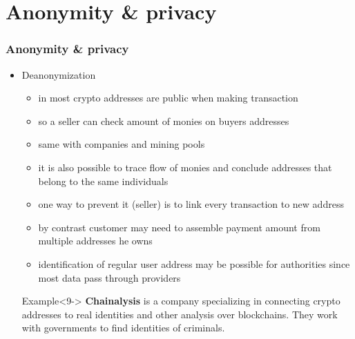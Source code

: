 \documentclass{beamer}
\begin{document}
\section{Anonymity \& privacy}
\begin{frame}
    \frametitle{Anonymity \& privacy}
    \begin{itemize}
        \item<1-> Deanonymization
        \begin{itemize}
            \item<2-> in most crypto addresses are public when making transaction
            \item<3-> so a seller can check amount of monies on buyers addresses
            \item<4-> same with companies and mining pools
            \item<5-> it is also possible to trace flow of monies and conclude addresses that belong to the same individuals
            \item<6-> one way to prevent it (seller) is to link every transaction to new address
            \item<7-> by contrast customer may need to assemble payment amount from multiple addresses he owns
            \item<8-> identification of regular user address may be possible for authorities since most data pass through providers
        \end{itemize}
        \begin{exampleblock}{Example}<9->
            \textbf{Chainalysis} is a company specializing in connecting crypto addresses to real identities and other analysis over blockchains. They work with governments to 
            find identities of criminals.
        \end{exampleblock}             
    \end{itemize}    
\end{frame}
\end{document}
